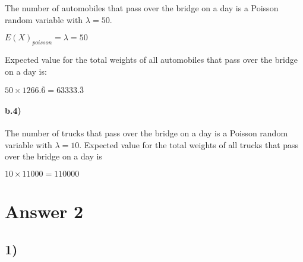 \documentclass[12pt]{article}
\begin{document}
The number of automobiles that pass over the bridge on a day is a Poisson random variable with
$\lambda = 50$.

$E(X)_{poisson} = \lambda = 50$

Expected value for the total weights of all automobiles that pass over the bridge on a day is:
\begin{center}
$50 \times 1266.\overline{6} = 63333.\overline{3}$
\end{center}

\paragraph{b.4)}
The number of trucks that pass over the bridge on a day is a Poisson random variable with
$\lambda = 10$.
Expected value for the total weights of all trucks that pass over the bridge on a day is
\begin{center}
    $10 \times 11000 = 110000$
\end{center}

\section*{Answer 2}
\subsection*{1)}
\end{document}
